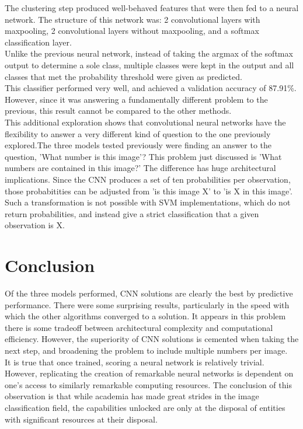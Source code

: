 \documentclass[12pt]{article}
\begin{document}
The clustering step produced well-behaved features that were then fed to a neural network. The structure of this network was: 2 convolutional layers with maxpooling, 2 convolutional layers without maxpooling, and a softmax classification layer.\\

Unlike the previous neural network, instead of taking the argmax of the softmax output to determine a sole class, multiple classes were kept in the output and all classes that met the probability threshold were given as predicted.\\

This classifier performed very well, and achieved a validation accuracy of 87.91\%. However, since it was answering a fundamentally different problem to the previous, this result cannot be compared to the other methods.\\

This additional exploration shows that convolutional neural networks have the flexibility to answer a very different kind of question to the one previously explored.The three models tested previously were finding an answer to the question, 'What number is this image'? This problem just discussed is 'What numbers are contained in this image?' The difference has huge architectural implications. Since the CNN produces a set of ten probabilities per observation, those probabitities can be adjusted from 'is this image X' to 'is X in this image'. Such a transformation is not possible with SVM implementations, which do not return probabilities, and instead give a strict classification that a given observation is X.\\

\newpage
\section{Conclusion}

Of the three models performed, CNN solutions are clearly the best by predictive performance. There were some surprising results, particularly in the speed with which the other algorithms converged to a solution. It appears in this problem there is some tradeoff between architectural complexity and computational efficiency. However, the superiority of CNN solutions is cemented when taking the next step, and broadening the problem to include multiple numbers per image.\\

It is true that once trained, scoring a neural network is relatively trivial. However, replicating the creation of remarkable neural networks is dependent on one's access to similarly remarkable computing resources. The conclusion of this observation is that while academia has made great strides in the image classification field, the capabilities unlocked are only at the disposal of entities with significant resources at their disposal.\\
\end{document}
